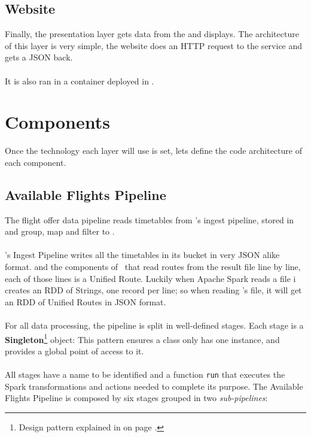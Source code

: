 
\subsection{Website}

Finally, the presentation layer gets data from the  and displays. The architecture of this layer is very simple, the website does an HTTP request to the service and gets a JSON back.
\\\\
It is also ran in a  container deployed in .


\section{Components}

Once the technology each layer will use is set, lets define the code architecture of each component.


\subsection{Available Flights Pipeline} \label{available-flights-pipeline}

The flight offer data pipeline reads timetables from \squad's ingest pipeline, stored in  and group, map and filter to .
\\\\
\squad's Ingest Pipeline writes all the timetables in its  bucket in very JSON\cite{json} alike format.  and the components of \squad\ that read routes from the result file line by line, each of those lines is a Unified Route. Luckily when Apache Spark reads a file i creates an RDD of Strings, one record per line; so when reading \squad's file, it will get an RDD of Unified Routes in JSON\cite{json} format.
\\\\
For all data processing, the pipeline is split in well-defined stages. Each stage is a \textbf{Singleton}\footnote{Design pattern explained in  on page \pageref{appendix_b}.} object: This pattern ensures a class only has one instance, and provides a global point of access to it.
\\\\
All stages have a name to be identified and a function \texttt{run} that executes the Spark transformations and actions needed to complete its purpose. The Available Flights Pipeline is composed by six stages grouped in two \textit{sub-pipelines}:

